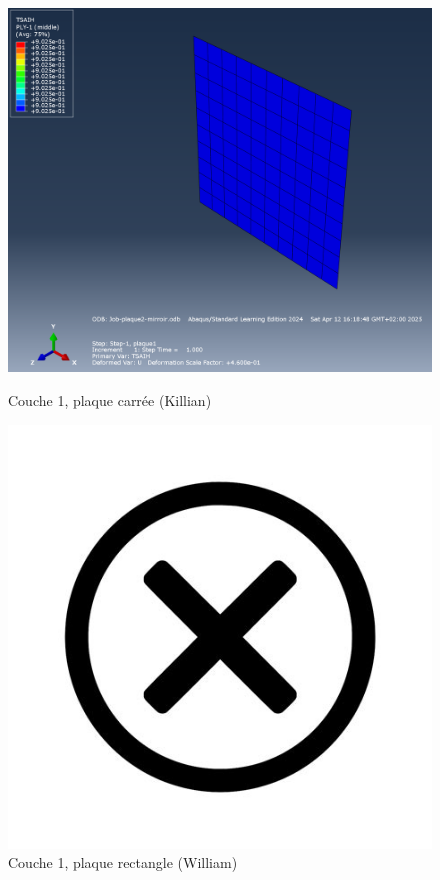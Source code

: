 \documentclass[a4paper,12pt]{article}
\begin{document}
\begin{figure}[H]
	\centering
	\begin{minipage}[t][0.3\textheight]{0.495\textwidth}
		\centering
		\includegraphics[width=\textwidth]{media/K_P2_L1-8_12042025.png} %
		\caption{Couche 1, plaque carrée (Killian)}
		\label{fig:image1}
	\end{minipage}
	\hfill
	\begin{minipage}[t][0.3\textheight]{0.495\textwidth}
		\centering
		\includegraphics[width=\textwidth]{media/no-image.jpg} %
		\caption{Couche 1, plaque rectangle (William)}
		\label{fig:image2}
	\end{minipage}
\end{figure}
\end{document}

